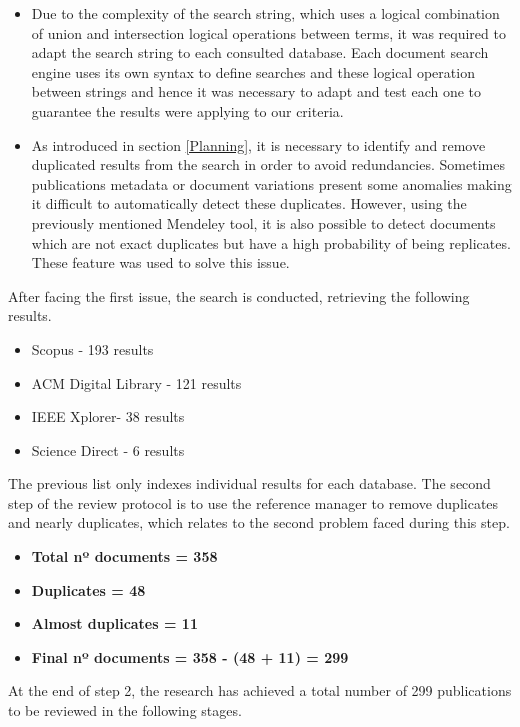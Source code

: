 \begin{itemize}
\item Due to the complexity of the search string, which uses a logical combination of union and intersection logical operations between terms, it was required to adapt the search string to each consulted database. Each document search engine uses its own syntax to define searches and these logical operation between strings and hence it was necessary to adapt and test each one to guarantee the results were applying to our criteria.
\item As introduced in section \ref{Planning}, it is necessary to identify and remove duplicated results from the search in order to avoid redundancies. Sometimes publications metadata or document variations present some anomalies making it difficult to automatically detect these duplicates. However, using the previously mentioned Mendeley tool, it is also possible to detect documents which are not exact duplicates but have a high probability of being replicates. These feature was used to solve this issue.
\end{itemize}

After facing the first issue, the search is conducted, retrieving the following results.

\begin{itemize}
\item Scopus - 193 results
\item ACM Digital Library - 121 results
\item IEEE Xplorer- 38 results
\item Science Direct - 6 results
\end{itemize}

The previous list only indexes individual results for each database. The second step of the review protocol is to use the reference manager to remove duplicates and nearly duplicates, which relates to the second problem faced during this step. 

\begin{itemize}
\item \textbf{Total nº documents = 358}
\item \textbf{Duplicates = 48}
\item \textbf{Almost duplicates = 11}
\item \textbf{Final nº documents = 358 - (48 + 11) = 299}
\end{itemize}

At the end of step 2, the research has achieved a total number of 299 publications to be reviewed in the following stages.

